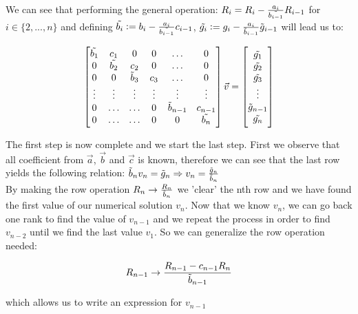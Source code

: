\documentclass[a4paper,10pt,english]{article}
\begin{document}
			We can see that performing the general operation:
			$R_i = R_i - \frac{a_i}{\Tilde{b_{i-1}}}R_{i-1}$ for $i \in \{2, ..., n\}$ and
			defining $\Tilde{b_i} := b_i -\frac{a_i}{\Tilde{b_{i-1}}}c_{i-1}$,
			$\Tilde{g_i} := g_i - \frac{a_i}{\Tilde{b}_{i-1}}\Tilde{g}_{i-1}$ will lead us
			to:
			
			\[
			\begin{bmatrix}
				\Tilde{b_1} & c_1 & 0 & 0 & \dots & 0 \\
				0 & \Tilde{b_2} & c_2 & 0 & \dots & 0\\
				0 & 0 & \Tilde{b}_3 & c_3 & \dots & 0\\
				\vdots & \vdots &  \vdots & \vdots & \vdots & \vdots \\
				0 & \dots &  \dots & 0 & \Tilde{b}_{n-1} & c_{n-1} \\
				0 & \dots &  \dots & 0 & 0 & \Tilde{b_{n}}
			\end{bmatrix}
			\vec{v}
			=
			\begin{bmatrix}
				\Tilde{g_1} \\
				\Tilde{g_2} \\
				\Tilde{g_3} \\
				\vdots \\
				\Tilde{g}_{n-1} \\
				\Tilde{g_n} \\
			\end{bmatrix}
			\]
			
			The first step is now complete and we start the last step. First we observe that
			all coefficient from $\vec{a}$, $\vec{b}$ and $\vec{c}$ is known, therefore we
			can see that the last row yields the following relation:
			$\Tilde{b}_n v_n = \Tilde{g}_n \Rightarrow v_n = \frac{\Tilde{g}_n}{\Tilde{b}_n}$
			\\
			
			By making the row operation $R_n \rightarrow \frac{R_n}{\Tilde{b}_n}$ we 'clear'
			the nth row and we have found the first value of our numerical solution $v_n$.
			Now that we know $v_n$, we can go back one rank to find the value of $v_{n-1}$
			and we repeat the process in order to find $v_{n-2}$ until we find the last
			value $v_1$. So we can generalize the row operation needed:
			
			\begin{equation*}
				R_{n-1} \rightarrow \frac{R_{n-1} - c_{n-1}R_n}{\Tilde{b}_{n-1}}
			\end{equation*}
			
			which allows us to write an expression for $v_{n-1}$
			
\end{document}

